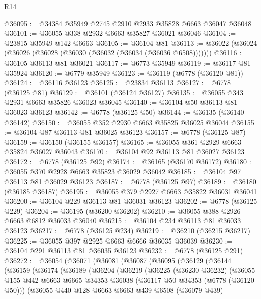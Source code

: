 \begin{lexlean}{R14}
\begin{coremodule}
@36095 := @34384 @35949 @2745 @2910 @2933 @35828 @6663 @36047 @36048
@36101 := @36055 @338 @2932 @6663 @35827 @36021 @36046
@36104 := @23815 @35949 @142 @6663
@36105 := @36104 @81
@36113 := @36022 (@36024 (@36026 (@36028 (@36030 (@36032 (@36034 (@36036 @6508)))))))
@36116 := @36105 @36113 @81 @36021
@36117 := @6773 @35949
@36119 := @36117 @81 @35924
@36120 := @6779 @35949
@36123 := @36119 (@6778 (@36120 @81))
@36124 := @36116 @36123
@36125 := @23834 @36113
@36127 := @6778 (@36125 @81)
@36129 := @36101 (@36124 @36127)
@36135 := @36055 @343 @2931 @6663 @35826 @36023 @36045
@36140 := @36104 @50 @36113 @81 @36023 @36123
@36142 := @6778 (@36125 @50)
@36144 := @36135 (@36140 @36142)
@36150 := @36055 @352 @2930 @6663 @35825 @36025 @36044
@36155 := @36104 @87 @36113 @81 @36025 @36123
@36157 := @6778 (@36125 @87)
@36159 := @36150 (@36155 @36157)
@36165 := @36055 @361 @2929 @6663 @35824 @36027 @36043
@36170 := @36104 @92 @36113 @81 @36027 @36123
@36172 := @6778 (@36125 @92)
@36174 := @36165 (@36170 @36172)
@36180 := @36055 @370 @2928 @6663 @35823 @36029 @36042
@36185 := @36104 @97 @36113 @81 @36029 @36123
@36187 := @6778 (@36125 @97)
@36189 := @36180 (@36185 @36187)
@36195 := @36055 @379 @2927 @6663 @35822 @36031 @36041
@36200 := @36104 @229 @36113 @81 @36031 @36123
@36202 := @6778 (@36125 @229)
@36204 := @36195 (@36200 @36202)
@36210 := @36055 @388 @2926 @6663 @6812 @36033 @36040
@36215 := @36104 @234 @36113 @81 @36033 @36123
@36217 := @6778 (@36125 @234)
@36219 := @36210 (@36215 @36217)
@36225 := @36055 @397 @2925 @6663 @6666 @36035 @36039
@36230 := @36104 @291 @36113 @81 @36035 @36123
@36232 := @6778 (@36125 @291)
@36272 := @36054
    (@36071
      (@36081
        (@36087
          (@36095
            (@36129
              (@36144
                (@36159
                  (@36174
                    (@36189
                      (@36204
                        (@36219
                          (@36225
                            (@36230 @36232)
                            (@36055
                              @155
                              @442
                              @6663
                              @6665
                              @34353
                              @36038
                              (@36117 @50 @34353 (@6778 (@36120 @50)))
                              (@36055
                                @440
                                @128
                                @6663
                                @6663
                                @439
                                @6508
                                (@36079 @439)

\end{coremodule}
\end{lexlean}

